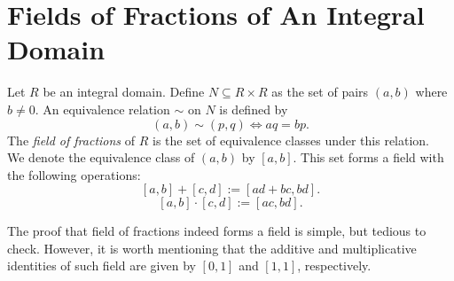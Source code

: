\section{Fields of Fractions of An Integral Domain}
\begin{definition}  
Let \( R \) be an integral domain. Define \( N \subseteq R \times R \) as the set of pairs \( (a, b) \) where \( b \neq 0 \). An equivalence relation \(\sim\) on \( N \) is defined by  
\[
(a, b) \sim (p, q) \iff aq = bp.
\] 
The \textit{field of fractions} of \( R \) is the set of equivalence classes under this relation.\\
We denote the equivalence class of \( (a, b) \) by \([a, b]\). This set forms a field with the following operations:  
\[
[a, b] + [c, d] := [ad + bc, bd].
\]  
\[
[a, b] \cdot [c, d] := [ac, bd].
\] 
\end{definition}
The proof that field of fractions indeed forms a field is simple, but tedious to check. However, it is worth mentioning that the additive and multiplicative identities of such field are given by \([0, 1]\) and \([1, 1]\), respectively.
